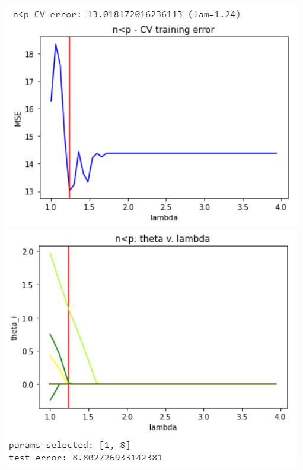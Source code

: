 \documentclass[11pt]{article}
\begin{document}
\begin{center}
\includegraphics[scale=0.7]{charts/ridge_q_ortho_n_lt_p_err.PNG}
\includegraphics[scale=0.7]{charts/ridge_q_ortho_n_lt_p_thetas.PNG}


\end{center}
\end{document}
